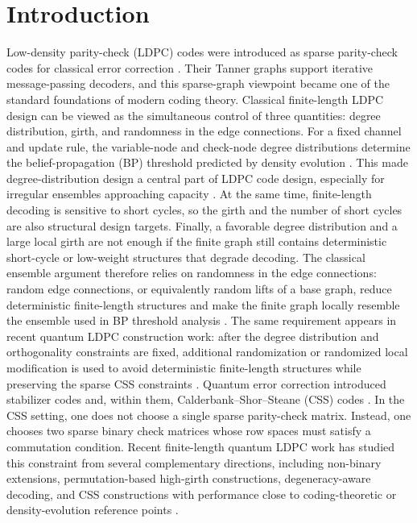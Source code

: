 \documentclass[11pt,a4paper]{article}
\theoremstyle{uprighttheorem}
\begin{document}
\section{Introduction}
Low-density parity-check (LDPC) codes were introduced as sparse parity-check codes for classical error correction \cite{gallager1962ldpc}.
Their Tanner graphs support iterative message-passing decoders, and this sparse-graph viewpoint became one of the standard foundations of modern coding theory.
Classical finite-length LDPC design can be viewed as the simultaneous control of three quantities: degree distribution, girth, and randomness in the edge connections.
For a fixed channel and update rule, the variable-node and check-node degree distributions determine the belief-propagation (BP) threshold predicted by density evolution \cite{richardson2001capacity}.
This made degree-distribution design a central part of LDPC code design, especially for irregular ensembles approaching capacity \cite{richardson2001design}.
At the same time, finite-length decoding is sensitive to short cycles, so the girth and the number of short cycles are also structural design targets.
Finally, a favorable degree distribution and a large local girth are not enough if the finite graph still contains deterministic short-cycle or low-weight structures that degrade decoding.
The classical ensemble argument therefore relies on randomness in the edge connections: random edge connections, or equivalently random lifts of a base graph, reduce deterministic finite-length structures and make the finite graph locally resemble the ensemble used in BP threshold analysis \cite{kelley2008ldpc}.
The same requirement appears in recent quantum LDPC construction work: after the degree distribution and orthogonality constraints are fixed, additional randomization or randomized local modification is used to avoid deterministic finite-length structures while preserving the sparse CSS constraints \cite{okada2025random}.
Quantum error correction introduced stabilizer codes and, within them, Calderbank--Shor--Steane (CSS) codes \cite{calderbank1996good,steane1996multiple}.
In the CSS setting, one does not choose a single sparse parity-check matrix.
Instead, one chooses two sparse binary check matrices whose row spaces must satisfy a commutation condition.
Recent finite-length quantum LDPC work has studied this constraint from several complementary directions, including non-binary extensions, permutation-based high-girth constructions, degeneracy-aware decoding, and CSS constructions with performance close to coding-theoretic or density-evolution reference points \cite{komoto2025codingbound,kasai2025errorfloor,kasai2025degeneracy,kasai2026orthogonality}.
\end{document}
